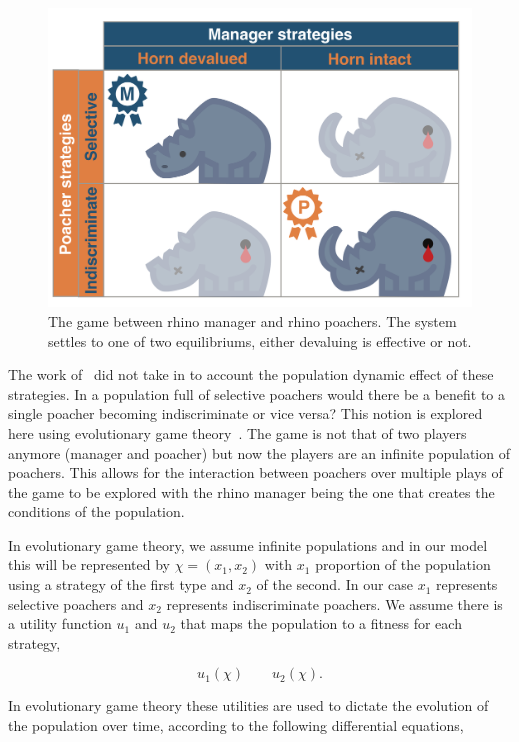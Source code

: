 \documentclass[10pt]{article}
\begin{document}
\begin{figure}[!htbp]
    \centering
    \includegraphics[scale=0.2]{images/RhinoPic.pdf}
    \caption{\label{fig:RhinoPic} The game between rhino manager and rhino 
    poachers. The system settles to one of two equilibriums, either devaluing is effective or not.}
\end{figure}

The work of~\cite{Lee} did not take in to account the population dynamic effect
of  these strategies. In a population full of selective poachers would there be 
a benefit to a single poacher becoming indiscriminate or vice versa? This notion 
is explored here using evolutionary game theory~\cite{Smith}. The 
game is not that of two players anymore (manager and poacher) but now the players are an infinite
population of poachers. This allows for the interaction between poachers
over multiple plays of the game to be explored with the rhino manager being the
one that creates the conditions of the population. 

In evolutionary game theory, we assume infinite populations and in our
model this will be represented by \(\chi=(x_1, x_2)\) with \(x_1\) proportion of the
population using a strategy of the first type and \(x_2\) of the second. In our case 
\(x_1\) represents selective poachers and \(x_2\) represents indiscriminate poachers.
We assume there is a utility function \(u_1\) and 
\(u_2\) that maps the population to a fitness for each strategy,

\[ u_1(\chi)  \qquad u_2(\chi).\] 

In evolutionary game theory these utilities are used to dictate the evolution of
the population over time, according to the following differential equations,
\end{document}
